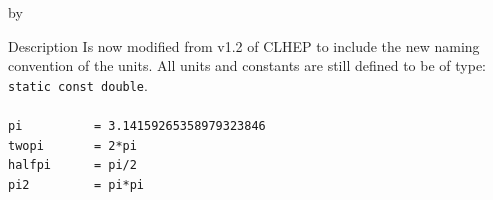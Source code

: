 \documentclass[twoside]{article}
\newcommand{\comp}[1]{\texttt{#1}}%
\newcommand{\entrylabel}[1]{\mbox{\textbf{{#1}}}\hfil}%
\newenvironment{entry}
{\begin{list}{}%
    {\renewcommand{\makelabel}{\entrylabel}%
     \setlength{\labelwidth}{90pt}%
     \setlength{\leftmargin}{\labelwidth}
     \advance\leftmargin by \labelsep%
      }%
    }%
  {\end{list}}
\newcommand{\Entrylabel}[1]%
{\raisebox{0pt}[1ex][0pt]{\makebox[\labelwidth][l]%
    {\parbox[t]{\labelwidth}{\hspace{0pt}\textbf{{#1}}}}}}
\newenvironment{Entry}%
{\renewcommand{\entrylabel}{\Entrylabel}\begin{entry}}%
  {\end{entry}}
\begin{document}
\begin{description}
\begin{Entry}
  
\item[Description]
  Is now modified from v1.2 of CLHEP  to include the
  new naming convention of the units.  All units
  and constants are still defined to be of type:\\ \comp{static const double}. \\ \\
  \verb+pi          = 3.14159265358979323846+ \\   
  \verb+twopi       = 2*pi+  \\                    
  \verb+halfpi      = pi/2+ \\                     
  \verb+pi2         = pi*pi+ \\                    
  

\end{Entry}
\end{description}
\end{document}
